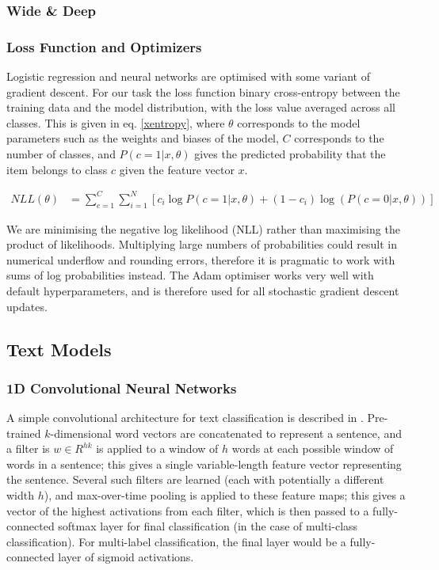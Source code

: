 \subsubsection{Wide \& Deep}



\subsubsection{Loss Function and Optimizers}
\label{loss}

Logistic regression and neural networks are optimised with some variant of gradient descent.
For our task the loss function binary cross-entropy between the training data and the model distribution, with the loss value averaged across all classes.
This is given in eq. \ref{xentropy}, where $\theta$ corresponds to the model parameters such as the weights and biases of the model, $C$ corresponds to the number of classes, and $P(c=1|x, \theta)$ gives the predicted probability that the item belongs to class $c$ given the feature vector $x$.

\begin{align}
  \label{xentropy}
  NLL(\theta) &= \sum\limits_{c=1}^C \sum\limits_{i=1}^N\left[c_i\log P(c=1|x, \theta) + (1-c_i)\log(P(c=0|x, \theta) )\right]
\end{align}

We are minimising the negative log likelihood (NLL) rather than maximising the product of likelihoods.
Multiplying large numbers of probabilities could result in numerical underflow and rounding errors, therefore it is pragmatic to work with sums of log probabilities instead.
The Adam \cite{adam} optimiser works very well with default hyperparameters, and is therefore used for all stochastic gradient descent updates.

\subsection{Text Models}
\label{text_models}

\subsubsection{1D Convolutional Neural Networks}

A simple convolutional architecture for text classification is described in \cite{1dcnn}.
Pre-trained $k$-dimensional word vectors are concatenated to represent a sentence, and a filter is $w \in R^{hk}$ is applied to a window of $h$ words at each possible window of words in a sentence; this gives a single variable-length feature vector representing the sentence.
Several such filters are learned (each with potentially a different width $h$), and max-over-time pooling is applied to these feature maps; this gives a vector of the highest activations from each filter, which is then passed to a fully-connected softmax layer for final classification (in the case of multi-class classification).
For multi-label classification, the final layer would be a fully-connected layer of sigmoid activations.

